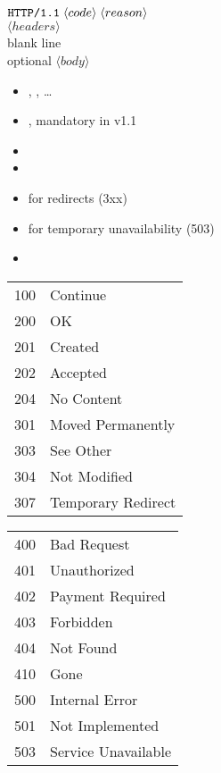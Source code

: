 \documentclass{sepslide-soa-faked} %
\begin{document}
\begin{slide}
$ \verb"HTTP/1.1" \; \langle code \rangle \; \langle reason \rangle $ \\
$ \langle headers \rangle $ \\
blank line \\
optional $ \langle body \rangle $
\begin{itemize}
\item {}, , \ldots
\item {}, mandatory in v1.1
\item {}
\item {}
\item {} for redirects (3xx)
\item {} for temporary unavailability (503)
\item {}
\end{itemize}
\end{slide}

\begin{slide}
\begin{minipage}{0.4\textwidth}
\begin{tabular}{@{}ll@{}}
100 & Continue \\[1ex] %
200 & OK \\ %
201 & Created \\ %
202 & Accepted \\ %
204 & No Content \\[1ex]
301 & Moved Permanently \\
303 & See Other \\
304 & Not Modified \\
307 & Temporary Redirect \\[1ex]
\end{tabular}
\end{minipage}
\hfil
%
\begin{minipage}{0.4\textwidth}
\begin{tabular}{@{}ll@{}}
400 & Bad Request \\
401 & Unauthorized \\
402 & Payment Required \\
403 & Forbidden \\
404 & Not Found \\
410 & Gone \\[1ex]
500 & Internal Error \\
501 & Not Implemented \\
503 & Service Unavailable 
\end{tabular}
\end{minipage}
\end{slide}
\end{document}
